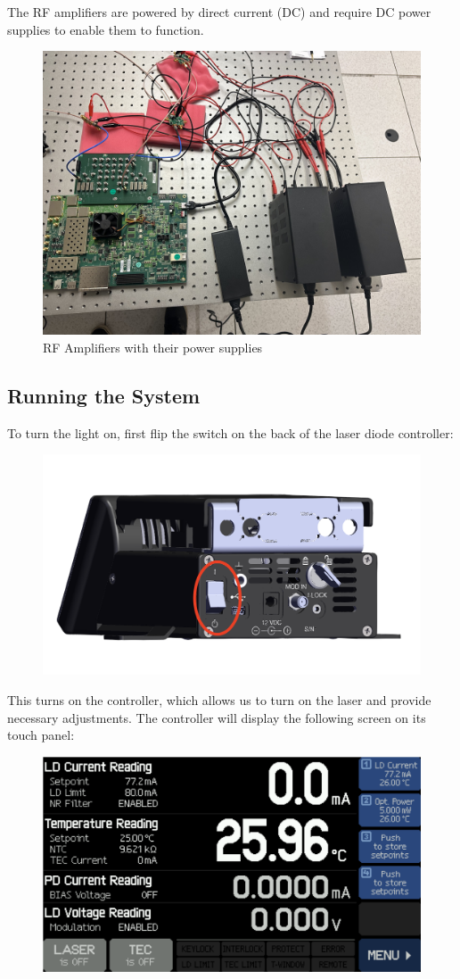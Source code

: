\documentclass[11pt]{article}
\begin{document}
The RF amplifiers are powered by direct current (DC) and require DC power supplies to enable them to function.

\begin{figure}[H]
    \centering
    \includegraphics[width=0.5\linewidth]{rfamplifiers.jpg}
    \caption{RF Amplifiers with their power supplies}
    \label{fig:enter-label}
\end{figure}

\subsection{Running the System}

To turn the light on, first flip the switch on the back of the laser diode controller:

\begin{figure}[H]
    \centering
    \includegraphics[width=0.5\linewidth]{diodeswitch.png}
    \label{fig:enter-label}
\end{figure}

This turns on the controller, which allows us to turn on the laser and provide necessary adjustments. The controller will display the following screen on its touch panel:

\begin{figure}[H]
    \centering
    \includegraphics[width=0.5\linewidth]{laseroff.png}
    \label{fig:enter-label}
\end{figure}
\end{document}
